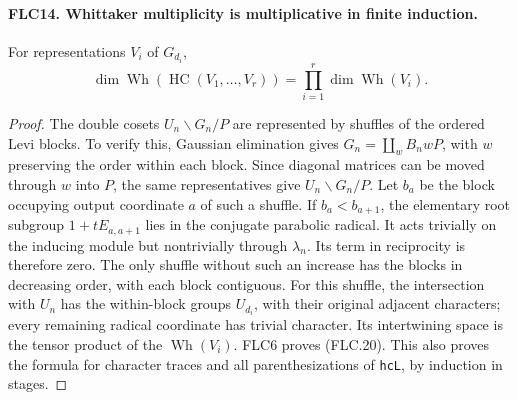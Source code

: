 \documentclass[11pt,a4paper]{article}
\numberwithin{equation}{section}
\theoremstyle{remark}\newtheorem{remark}[theorem]{Remark}
\begin{document}
\paragraph{FLC14. Whittaker multiplicity is multiplicative in finite induction.}
\label{claim:FLC14}
For representations $V_i$ of $G_{d_i}$,
\[
 \dim\operatorname{Wh}(\operatorname{HC}(V_1,\ldots,V_r))
                    =\prod_{i=1}^r\dim\operatorname{Wh}(V_i).
 \tag{FLC.20}
\]
\begin{proof}
The double cosets $U_n\backslash G_n/P$ are represented by
shuffles of the ordered Levi blocks.  To verify this, Gaussian
elimination gives $G_n=\coprod_w B_n wP$, with $w$ preserving
the order within each block.  Since diagonal matrices can
be moved through $w$ into $P$, the same representatives give
$U_n\backslash G_n/P$.
Let $b_a$ be the block occupying output coordinate $a$ of
such a shuffle.  If $b_a<b_{a+1}$, the elementary root subgroup
$1+tE_{a,a+1}$ lies in the conjugate parabolic radical.
It acts trivially on the inducing module but nontrivially
through $\lambda_n$.  Its term in reciprocity is therefore
zero.  The only shuffle without such an increase has the
blocks in decreasing order, with each block contiguous.
For this shuffle, the intersection with $U_n$ has the
within-block groups $U_{d_i}$, with their original adjacent
characters; every remaining radical coordinate has trivial
character.  Its intertwining space is the tensor product
of the $\operatorname{Wh}(V_i)$.  FLC6 proves (FLC.20).
This also proves the formula for character traces and all
parenthesizations of \texttt{hc\allowbreak L}, by induction in stages.
\end{proof}

\end{document}
